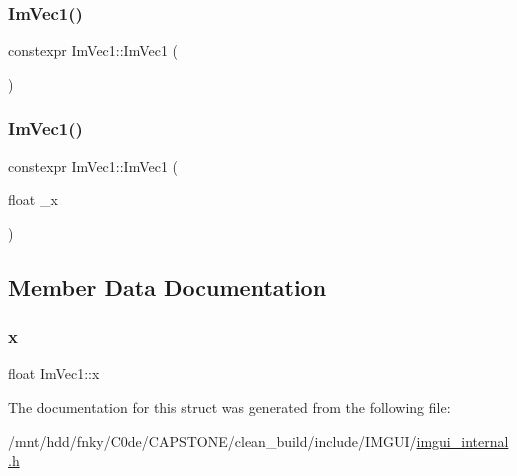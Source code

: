 \subsubsection{\texorpdfstring{Im\+Vec1()}{ImVec1()}\hspace{0.1cm}{\footnotesize\ttfamily [1/2]}}
{\footnotesize\ttfamily constexpr Im\+Vec1\+::\+Im\+Vec1 (\begin{DoxyParamCaption}{ }\end{DoxyParamCaption})\hspace{0.3cm}{\ttfamily [inline]}}

\mbox{\label{structImVec1_a1093e56497fc272e1c46eac72e567503}} 
\subsubsection{\texorpdfstring{Im\+Vec1()}{ImVec1()}\hspace{0.1cm}{\footnotesize\ttfamily [2/2]}}
{\footnotesize\ttfamily constexpr Im\+Vec1\+::\+Im\+Vec1 (\begin{DoxyParamCaption}\item[{float}]{\+\_\+x }\end{DoxyParamCaption})\hspace{0.3cm}{\ttfamily [inline]}}



\subsection{Member Data Documentation}
\mbox{\label{structImVec1_a825500197aa4fe7c4aa563ae547fd29b}} 
\subsubsection{\texorpdfstring{x}{x}}
{\footnotesize\ttfamily float Im\+Vec1\+::x}



The documentation for this struct was generated from the following file\+:\begin{DoxyCompactItemize}
\item 
/mnt/hdd/fnky/\+C0de/\+C\+A\+P\+S\+T\+O\+N\+E/clean\+\_\+build/include/\+I\+M\+G\+U\+I/\hyperlink{imgui__internal_8h}{imgui\+\_\+internal.\+h}\end{DoxyCompactItemize}
